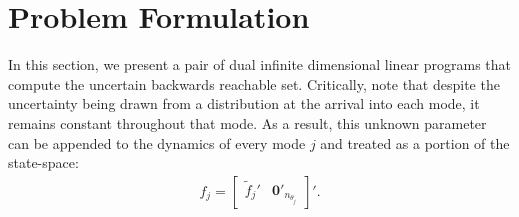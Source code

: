 \section{Problem Formulation}
\label{sec:prob}

In this section, we present a pair of dual infinite dimensional linear programs that compute the uncertain backwards reachable set. 
Critically, note that despite the uncertainty being drawn from a distribution at the arrival into each mode, it remains constant throughout that mode. 
As a result, this unknown parameter can be appended to the dynamics of every mode $j$ and treated as a portion of the state-space:
\begin{align}
f_j=\begin{bmatrix}
  \tilde f_j'&\mathbf{0}'_{n_{\theta_j}}
\end{bmatrix}'.
\end{align}

